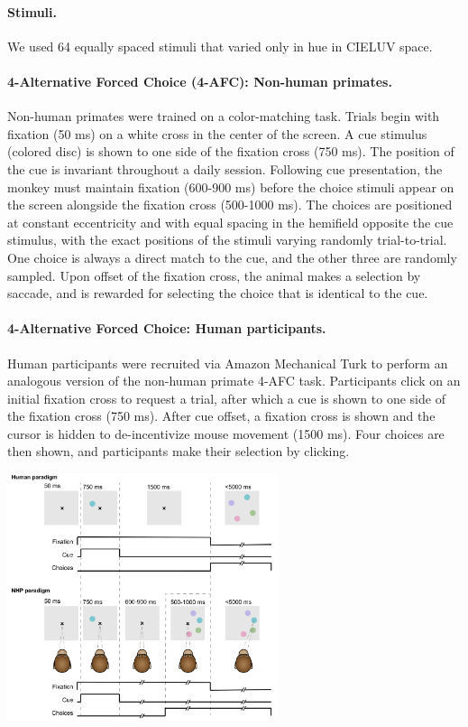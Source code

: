 \paragraph{Stimuli.} We used 64 equally spaced stimuli that varied only in hue in CIELUV space. 

\paragraph{4-Alternative Forced Choice (4-AFC): Non-human primates.} Non-human primates were trained on a color-matching task. Trials begin with fixation (50 ms) on a white cross in the center of the screen. A cue stimulus (colored disc) is shown to one side of the fixation cross (750 ms). The position of the cue is invariant throughout a daily session. Following cue presentation, the monkey must maintain fixation (600-900 ms) before the choice stimuli appear on the screen alongside the fixation cross (500-1000 ms). The choices are positioned at constant eccentricity and with equal spacing in the hemifield opposite the cue stimulus, with the exact positions of the stimuli varying randomly trial-to-trial. One choice is always a direct match to the cue, and the other three are randomly sampled. Upon offset of the fixation cross, the animal makes a selection by saccade, and is rewarded for selecting the choice that is identical to the cue. 

\paragraph{4-Alternative Forced Choice: Human participants.} Human participants were recruited via Amazon Mechanical Turk to perform an analogous version of the non-human primate 4-AFC task. Participants click on an initial fixation cross to request a trial, after which a cue is shown to one side of the fixation cross (750 ms). After cue offset, a fixation cross is shown and the cursor is hidden to de-incentivize mouse movement (1500 ms). Four choices are then shown, and participants make their selection by clicking. 

\includegraphics[width=300]{paradigm.pdf}

